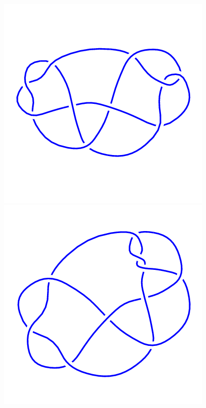 \begin{figure}[H]
    \begin{minipage}[b]{.18\linewidth}
        \centering
        \includegraphics[width=\linewidth]{../data/10_32.png}
    \end{minipage}
    \begin{minipage}[b]{.18\linewidth}
        \centering
        \includegraphics[width=\linewidth]{../data/10_33.png}

\end{minipage}
\end{figure}
